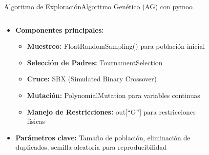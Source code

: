 \begin{frame}{Algoritmo de Exploración}{Algoritmo Genético (AG) con pymoo}
    \begin{columns}
        \begin{column}{0.6\textwidth}
            \small
            \begin{itemize}
                \item \textbf{Componentes principales:}
                \begin{itemize}
                    \item \textbf{Muestreo:} FloatRandomSampling() para población inicial %
                    \item \textbf{Selección de Padres:} TournamentSelection
                    \item \textbf{Cruce:} SBX (Simulated Binary Crossover)
                    \item \textbf{Mutación:} PolynomialMutation para variables continuas
                    \item \textbf{Manejo de Restricciones:} out[``G''] para restricciones físicas
                \end{itemize}
                \item \textbf{Parámetros clave:} Tamaño de población, eliminación de duplicados, semilla aleatoria para reproducibilidad
            \end{itemize}
        \end{column}
        \begin{column}{0.4\textwidth}
            \centering
            \begin{figure}[H]
                \centering
\end{figure}
\end{column}
\end{columns}
\end{frame}
